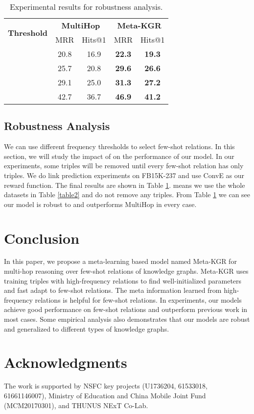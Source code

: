 \documentclass[11pt,a4paper]{article}
\begin{document}
\begin{table}[t]
\small
\centering
\setlength{\belowcaptionskip}{-1pt}
    \begin{tabular}{l|cc|cc}
    \toprule
    \multirow{2}{*}{\textbf{Threshold}} & \multicolumn{2}{c|}{\textbf{MultiHop}} & \multicolumn{2}{c}{\textbf{Meta-KGR}} \\
    & MRR & Hits@1  & MRR & Hits@1  \\
    \midrule
      & 20.8  & 16.9  & \textbf{22.3}   & \textbf{19.3}   \\
      & 25.7  & 20.8  & \textbf{29.6}   & \textbf{26.6}   \\
      & 29.1  & 25.0  & \textbf{31.3}   & \textbf{27.2}  \\
      & 42.7  & 36.7  & \textbf{46.9}   & \textbf{41.2}    \\
    \bottomrule
    \end{tabular}
    \caption{\label{table3} Experimental results for robustness analysis.}
\end{table}

\subsection{Robustness Analysis}

We can use different frequency thresholds  to select few-shot relations. In this section, we will study the impact of  on the performance of our model. In our experiments, some triples will be removed until every few-shot relation has only  triples. We do link prediction experiments on FB15K-237 and use ConvE as our reward function. The final results are shown in Table \ref{table3}.  means we use the whole datasets in Table \ref{table2} and do not remove any triples. From Table \ref{table3} we can see our model is robust to  and outperforms MultiHop in every case.

\section{Conclusion}

In this paper, we propose a meta-learning based model named Meta-KGR for multi-hop reasoning over few-shot relations of knowledge graphs. Meta-KGR uses training triples with high-frequency relations to find well-initialized parameters and fast adapt to few-shot relations. The meta information learned from high-frequency relations is helpful for few-shot relations. In experiments, our models achieve good performance on few-shot relations and outperform previous work in most cases. Some empirical analysis also demonstrates that our models are robust and generalized to different types of knowledge graphs.


\section*{Acknowledgments}
  
The work is supported by NSFC key projects (U1736204, 61533018, 61661146007), Ministry of Education and China Mobile Joint Fund (MCM20170301), and THUNUS NExT Co-Lab.



\end{document}
